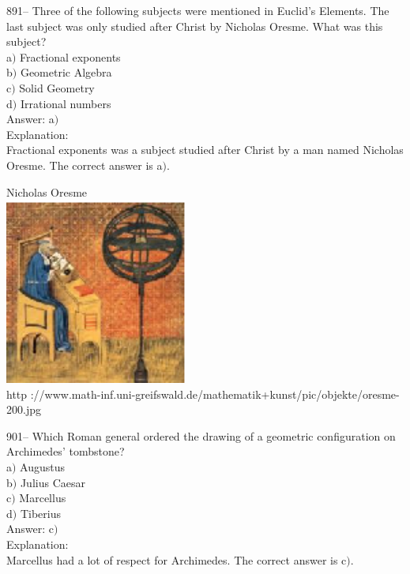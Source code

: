 \documentclass[letterpaper, 12pt]{article}
\begin{document}
891-- Three of the following subjects were mentioned in Euclid's Elements. The last subject was only studied after Christ by Nicholas Oresme. What was this subject?\\
	
a$)$ Fractional exponents \\
b$)$ Geometric Algebra \\
c$)$ Solid Geometry \\
d$)$ Irrational numbers\\

Answer: a$)$\\

Explanation: \\
Fractional exponents was a subject studied after Christ by a man named Nicholas Oresme. The correct answer is a$)$.\\

        \begin{center}
        Nicholas Oresme\\
    \includegraphics[width=6cm]{oresme.eps}\\
        {\footnotesize http
://www.math-inf.uni-greifswald.de/mathematik+kunst/pic/objekte/oresme-200.jpg}
    \end{center}

901-- Which Roman general ordered the drawing of a geometric configuration on Archimedes' tombstone?\\

a$)$ Augustus \\
b$)$ Julius Caesar \\
c$)$ Marcellus \\
d$)$ Tiberius \\

Answer: c$)$\\

Explanation: \\
Marcellus had a lot of respect for Archimedes. The correct answer is c$)$.\\
\end{document}
